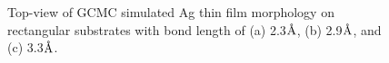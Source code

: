 \begingroup
\begin{figure}[!ht]
  \centering
  \label{Chap:Ag/ZnO:fig:8a}
  \label{Chap:Ag/ZnO:fig:8b}
  \label{Chap:Ag/ZnO:fig:8c}
\caption[GCMC simulation results of Ag thin film morphology on rectangular substrates.]{Top-view of \ac{GCMC} simulated Ag thin film morphology on rectangular substrates with bond length of (a) 2.3$\mbox{\normalfont\AA}$, (b) 2.9$\mbox{\normalfont\AA}$, and (c) 3.3$\mbox{\normalfont\AA}$.}
  \label{Chap:Ag/ZnO:fig8-1}
\end{figure}
\endgroup

